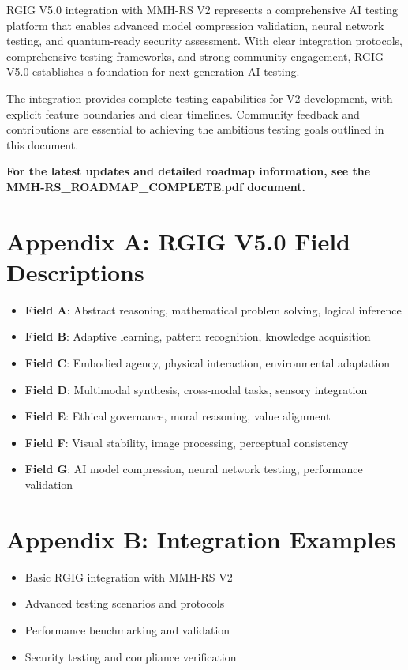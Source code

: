 \documentclass[12pt,a4paper]{article}
\begin{document}
RGIG V5.0 integration with MMH-RS V2 represents a comprehensive AI testing platform that enables advanced model compression validation, neural network testing, and quantum-ready security assessment. With clear integration protocols, comprehensive testing frameworks, and strong community engagement, RGIG V5.0 establishes a foundation for next-generation AI testing.

The integration provides complete testing capabilities for V2 development, with explicit feature boundaries and clear timelines. Community feedback and contributions are essential to achieving the ambitious testing goals outlined in this document.

\textbf{For the latest updates and detailed roadmap information, see the MMH-RS\_ROADMAP\_COMPLETE.pdf document.}

\appendix

\section{Appendix A: RGIG V5.0 Field Descriptions}
\begin{itemize}
    \item \textbf{Field A}: Abstract reasoning, mathematical problem solving, logical inference
    \item \textbf{Field B}: Adaptive learning, pattern recognition, knowledge acquisition
    \item \textbf{Field C}: Embodied agency, physical interaction, environmental adaptation
    \item \textbf{Field D}: Multimodal synthesis, cross-modal tasks, sensory integration
    \item \textbf{Field E}: Ethical governance, moral reasoning, value alignment
    \item \textbf{Field F}: Visual stability, image processing, perceptual consistency
    \item \textbf{Field G}: AI model compression, neural network testing, performance validation
\end{itemize}

\section{Appendix B: Integration Examples}
\begin{itemize}
    \item Basic RGIG integration with MMH-RS V2
    \item Advanced testing scenarios and protocols
    \item Performance benchmarking and validation
    \item Security testing and compliance verification
\end{itemize}
\end{document}
